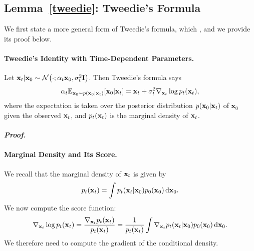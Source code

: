 \subsection{Lemma~\ref{tweedie}: Tweedie's Formula}\label{app-sec:tweedie}
We first state a more general form of Tweedie’s formula, which , and we provide its proof below.


\paragraph{Tweedie’s Identity with Time-Dependent Parameters.}
Let
${\mathbf{x}}_t|{\mathbf{x}}_0 \sim
\mathcal{N}\big(\cdot; \alpha_t{\mathbf{x}}_0, \sigma_t^2{\mathbf{I}}\big)$. Then Tweedie's formula says
\begin{align*}
\alpha_t \mathbb{E}_{\mathbf{x}_0 \sim p(\mathbf{x}_0|{\mathbf{x}}_t)}[\mathbf{x}_0|{\mathbf{x}}_t] = {\mathbf{x}}_t + \sigma_t^2 \nabla_{{\mathbf{x}}_t} \log p_t({\mathbf{x}}_t),
\end{align*}
where the expectation is taken over the posterior distribution $p(\mathbf{x}_0|{\mathbf{x}}_t)$ of $\mathbf{x}_0$ given the observed ${\mathbf{x}}_t$, and $p_t({\mathbf{x}}_t)$ is the marginal density of ${\mathbf{x}}_t$.


\paragraph{\textit{Proof.}}


\paragraph{Marginal Density and Its Score.}
We recall that the marginal density of ${\mathbf{x}}_t$ is given by
\begin{align*}
p_t({\mathbf{x}}_t) = \int p_t({\mathbf{x}}_t|{\mathbf{x}}_0)  p_0({\mathbf{x}}_0)  \mathop{}\!\mathrm{d}{\mathbf{x}}_0.
\end{align*}
We now compute the score function:
\begin{align*}
\nabla_{{\mathbf{x}}_t} \log p_t({\mathbf{x}}_t) 
= \frac{\nabla_{{\mathbf{x}}_t} p_t({\mathbf{x}}_t)}{p_t({\mathbf{x}}_t)} = \frac{1}{p_t({\mathbf{x}}_t)} \int \nabla_{{\mathbf{x}}_t} p_t({\mathbf{x}}_t|{\mathbf{x}}_0)  p_0({\mathbf{x}}_0)  \mathop{}\!\mathrm{d}{\mathbf{x}}_0.
\end{align*}
We therefore need to compute the gradient of the conditional density.

